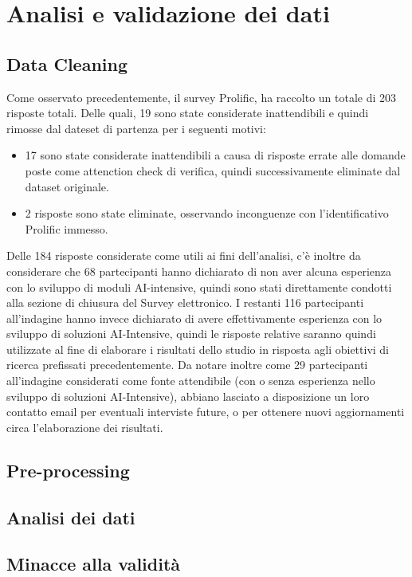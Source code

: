 \chapter{Analisi e validazione dei dati} %
%
     \section{Data Cleaning}
    
    Come osservato precedentemente, il survey Prolific, ha raccolto un totale di 203 risposte totali. Delle quali, 19 sono state considerate inattendibili e quindi rimosse dal dateset di partenza per i seguenti motivi:
    
    \begin{itemize}
        \item 17 sono state considerate inattendibili a causa di risposte errate alle domande poste come attenction check di verifica, quindi successivamente eliminate dal dataset originale.
        \item 2 risposte sono state eliminate, osservando inconguenze con l'identificativo Prolific immesso.
    \end{itemize}
     
    Delle 184 risposte considerate come utili ai fini dell'analisi, c'è inoltre da considerare che 68 partecipanti hanno dichiarato di non aver alcuna esperienza con lo sviluppo di moduli AI-intensive, quindi sono stati direttamente condotti alla sezione di chiusura del Survey elettronico. I restanti 116 partecipanti all'indagine hanno invece dichiarato di avere effettivamente esperienza con lo sviluppo di soluzioni AI-Intensive, quindi le risposte relative saranno quindi utilizzate al fine di elaborare i risultati dello studio in risposta agli obiettivi di ricerca prefissati precedentemente.  Da notare inoltre come 29 partecipanti all'indagine considerati come fonte attendibile (con o senza esperienza nello sviluppo di soluzioni AI-Intensive), abbiano lasciato a disposizione un loro contatto email per eventuali interviste future, o per ottenere nuovi aggiornamenti circa l'elaborazione dei risultati.  
    
    \section{Pre-processing}
    \section{Analisi dei dati}
    \section{Minacce alla validità}

\newpage
